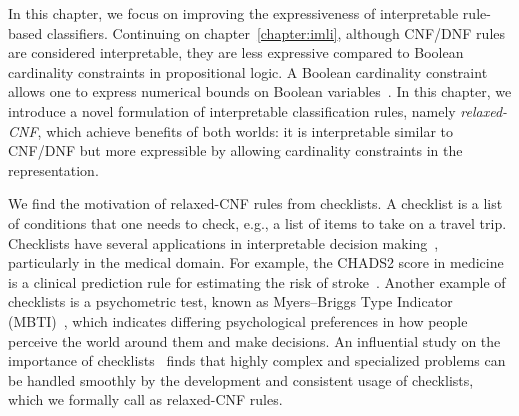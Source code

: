 
\label{chapter:crr}


In this chapter, we focus on improving the expressiveness of interpretable rule-based classifiers. Continuing on chapter~\ref{chapter:imli},
although CNF/DNF rules are considered interpretable, they are less expressive compared to Boolean cardinality constraints in propositional logic. A Boolean cardinality constraint allows one to express numerical bounds on Boolean variables~\cite{sinz2005towards}. In this chapter, we introduce a novel formulation of interpretable classification rules, namely \emph{relaxed-CNF}, which achieve benefits of  both worlds: it is interpretable similar to CNF/DNF  but more expressible by allowing cardinality constraints in the representation.


We find the motivation of relaxed-CNF rules from checklists. A checklist is a list of conditions that one needs to check, e.g., a list of items to take on a travel trip.  Checklists have several applications in interpretable decision making~\cite{M1976,gage2001validation}, particularly in the medical domain. For example, the  CHADS2 score in medicine is a clinical prediction rule for estimating the risk of stroke~\cite{gage2001validation}. Another example of checklists is a psychometric test, known as Myers–Briggs Type Indicator (MBTI)~\cite{M1976}, which indicates differing psychological preferences in how people perceive the world around them and make decisions.  An influential study on the importance of {checklists}~\cite{G2010} finds that highly complex and specialized problems can be handled smoothly by the development and consistent usage of checklists, which we formally call as relaxed-CNF rules. 


